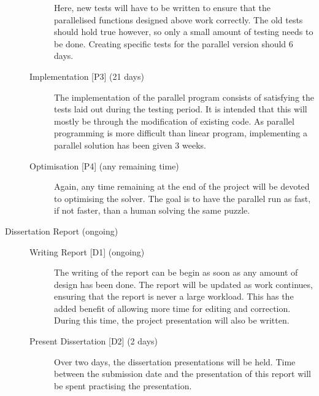\documentclass[main.tex]{subfiles}
\begin{document}
\begin{description}
\begin{description}
            Here, new tests will have to be written to ensure that the parallelised functions designed above work correctly.
            The old tests should hold true however, so only a small amount of testing needs to be done.
            Creating specific tests for the parallel version should 6 days.
          \item[Implementation {[P3]} (21 days)] 
            The implementation of the parallel program consists of satisfying the tests laid out during the testing period.
            It is intended that this will mostly be through the modification of existing code.
            As parallel programming is more difficult than linear program, implementing a parallel solution has been given 3 weeks.
          \item[Optimisation {[P4]} (any remaining time)]
            Again, any time remaining at the end of the project will be devoted to optimising the solver.
            The goal is to have the parallel run as fast, if not faster, than a human solving the same puzzle.
        \end{description}
      \item[Dissertation Report (ongoing)]\hfill
        \begin{description}
          \item[Writing Report {[D1]} (ongoing)]
            The writing of the report can be begin as soon as any amount of design has been done.
            The report will be updated as work continues, ensuring that the report is never a large workload.
            This has the added benefit of allowing more time for editing and correction.
            During this time, the project presentation will also be written.
          \item[Present Dissertation {[D2]} (2 days)]
            Over two days, the dissertation presentations will be held.
            Time between the submission date and the presentation of this report will be spent practising the presentation.
        \end{description}
    \end{description}
    \biblio
\end{document}
